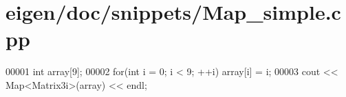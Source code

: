 \hypertarget{eigen_2doc_2snippets_2_map__simple_8cpp_source}{}\section{eigen/doc/snippets/\+Map\+\_\+simple.cpp}
\label{eigen_2doc_2snippets_2_map__simple_8cpp_source}

\begin{DoxyCode}
00001 \textcolor{keywordtype}{int} array[9];
00002 \textcolor{keywordflow}{for}(\textcolor{keywordtype}{int} i = 0; i < 9; ++i) array[i] = i;
00003 cout << Map<Matrix3i>(array) << endl;
\end{DoxyCode}
